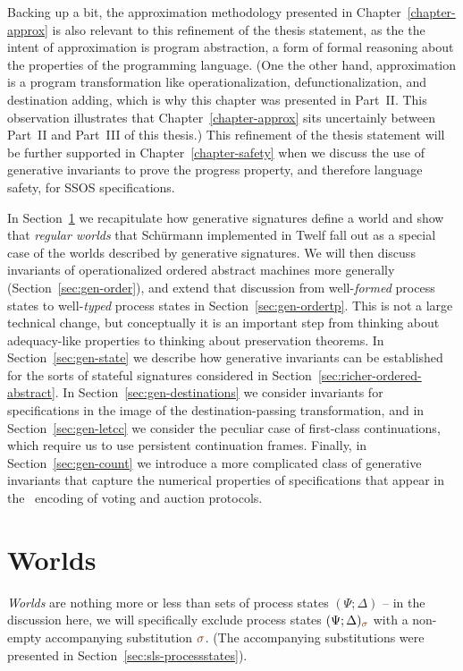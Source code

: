 \noindent
Backing up a bit, the approximation methodology presented in
Chapter~\ref{chapter-approx} is also relevant to this refinement of
the thesis statement, as the the intent of approximation is program
abstraction, a form of formal reasoning about the properties of the
programming language. (One the other hand, approximation is a
  program transformation like operationalization, defunctionalization,
  and destination adding, which is why this chapter was presented in
  Part~II. This observation illustrates that
  Chapter~\ref{chapter-approx} sits uncertainly between Part~II and
  Part~III of this thesis.) This refinement of the thesis statement
will be further supported in Chapter~\ref{chapter-safety} when we
discuss the use of generative invariants to prove the progress
property, and therefore language safety, for SSOS specifications.

In Section~\ref{sec:gen-worlds} we recapitulate how generative
signatures define a world and show that {\it regular worlds} that
Sch\"urmann implemented in Twelf \cite{schurmann00automating} fall out
as a special case of the worlds described by generative signatures.
We will then discuss invariants of operationalized ordered abstract
machines more generally (Section~\ref{sec:gen-order}), and extend that
discussion from well-{\it formed} process states to well-{\it typed}
process states in Section~\ref{sec:gen-ordertp}.  This is not a large
technical change, but conceptually it is an important step from
thinking about adequacy-like properties to thinking about preservation
theorems. In Section~\ref{sec:gen-state} we describe how generative
invariants can be established for the sorts of stateful signatures
considered in Section~\ref{sec:richer-ordered-abstract}. In
Section~\ref{sec:gen-destinations} we consider invariants for
specifications in the image of the destination-passing transformation,
and in Section~\ref{sec:gen-letcc} we consider the peculiar case of
first-class continuations, which require us to use persistent
continuation frames. Finally, in Section~\ref{sec:gen-count} we
introduce a more complicated class of generative invariants that
capture the numerical properties of specifications that appear in the
\sls~encoding of voting and auction protocols.

\section{Worlds}
\label{sec:gen-worlds}

{\it Worlds} are nothing more or less than sets of process states
$(\Psi; \Delta)$ -- in the discussion here, we will specifically
exclude process states $(\Psi; \Delta)_{\lf\sigma}$ with a non-empty
accompanying substitution $\lf\sigma$. (The accompanying substitutions
were presented in Section~\ref{sec:sls-processstates}).

